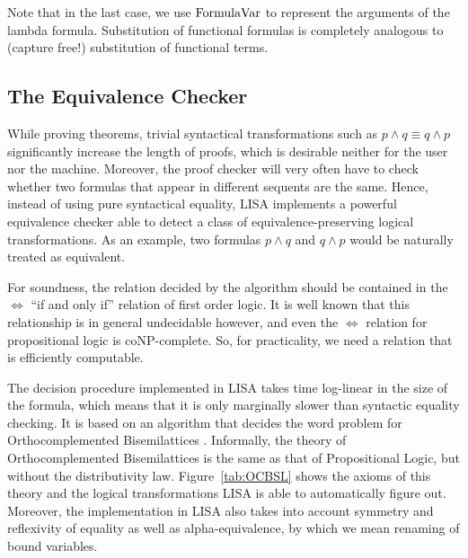Note that in the last case, we use $\operatorname{FormulaVar}$ to represent the arguments of the lambda formula. Substitution of functional formulas is completely analogous to (capture free!) substitution of functional terms.




\subsection{The Equivalence Checker}
\label{subs:equivalencechecker}

While proving theorems, trivial syntactical transformations such as $p\land q \equiv q\land p$ significantly increase the length of proofs, which is desirable neither for the user nor the machine. Moreover, the proof checker will very often have to check whether two formulas that appear in different sequents are the same. Hence, instead of using pure syntactical equality, LISA implements a powerful equivalence checker able to detect a class of equivalence-preserving logical transformations. As an example, two formulas $p\land q$ and $q\land p$ would be naturally treated as equivalent.

For soundness, the relation decided by the algorithm should be contained in the $\Longleftrightarrow$ ``if and only if'' relation of first order logic. It is well known that this relationship is in general undecidable however, and even the $\Longleftrightarrow$ relation for propositional logic is coNP-complete. So, for practicality, we need a relation that is efficiently computable.

The decision procedure implemented in LISA takes time log-linear in the size of the formula, which means that it is only marginally slower than syntactic equality checking. It is based on an algorithm  that decides the word problem for Orthocomplemented Bisemilattices \cite{DBLP:conf/tacas/GuilloudK22}. Informally, the theory of Orthocomplemented Bisemilattices is the same as that of Propositional Logic, but without the distributivity law. Figure~\ref{tab:OCBSL} shows the axioms of this theory and the logical transformations LISA is able to automatically figure out.
Moreover, the implementation in LISA also takes into account symmetry and reflexivity of equality as well as alpha-equivalence, by which we mean renaming of bound variables.

